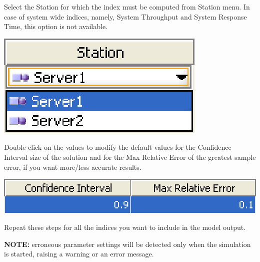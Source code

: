\begin{enumerate*}
\begin{center}
\end{center}
\item Select the Station for which the index must be computed from Station menu. In case of system wide indices, namely, System Throughput and System Response Time, this option is not available.
\begin{center}
\includegraphics[scale=.5]{img/jsim/station.eps}
\end{center}
\item Double click on the values to modify the default values for the Confidence Interval size of the solution and for the Max Relative Error of the greatest sample error, if you want more/less accurate results.
\begin{center}
\includegraphics[scale=.5]{img/jsim/err_conf.eps}
\end{center}
\item Repeat these steps for all the indices you want to include in the model output.
\end{enumerate*}
\textbf{NOTE:} erroneous parameter settings will be detected only when the simulation is started, raising a warning or an error message.

